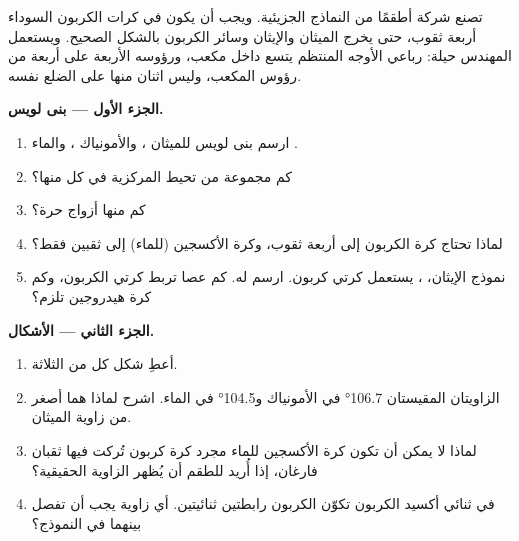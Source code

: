 \begin{problem}
\label{pb:g10:lewis-and-shape:1}
تصنع شركة أطقمًا من النماذج الجزيئية. ويجب أن يكون في كرات الكربون السوداء
أربعة ثقوب، حتى يخرج الميثان والإيثان وسائر  الكربون بالشكل الصحيح.
ويستعمل المهندس حيلة: رباعي الأوجه المنتظم يتسع داخل مكعب، ورؤوسه الأربعة
على أربعة من رؤوس المكعب، وليس اثنان منها على الضلع
نفسه.

\medskip
\noindent\textbf{الجزء الأول --- بنى لويس.}
\begin{enumerate}
  \item ارسم بنى لويس للميثان ، والأمونياك ،
        والماء .
  \item كم مجموعة من  تحيط  المركزية في كل منها؟
  \item كم منها أزواج حرة؟
  \item لماذا تحتاج كرة الكربون إلى أربعة ثقوب، وكرة الأكسجين (للماء)
        إلى ثقبين فقط؟
  \item نموذج الإيثان، ، يستعمل كرتي كربون. ارسم 
        له. كم عصا تربط كرتي الكربون، وكم كرة هيدروجين
        تلزم؟
\end{enumerate}

\medskip
\noindent\textbf{الجزء الثاني --- الأشكال.}
\begin{enumerate}[resume]
  \item أعطِ شكل كل من  الثلاثة.
  \item الزاويتان المقيستان \ang{106.7} في الأمونياك و\ang{104.5} في
        الماء. اشرح لماذا هما أصغر من زاوية الميثان.
  \item لماذا لا يمكن أن تكون كرة الأكسجين للماء مجرد كرة كربون تُركت فيها
        ثقبان فارغان، إذا أُريد للطقم أن يُظهر الزاوية الحقيقية؟
  \item في ثنائي أكسيد الكربون تكوّن  الكربون رابطتين ثنائيتين. أي
        زاوية يجب أن تفصل بينهما في النموذج؟
\end{enumerate}


\end{problem}
